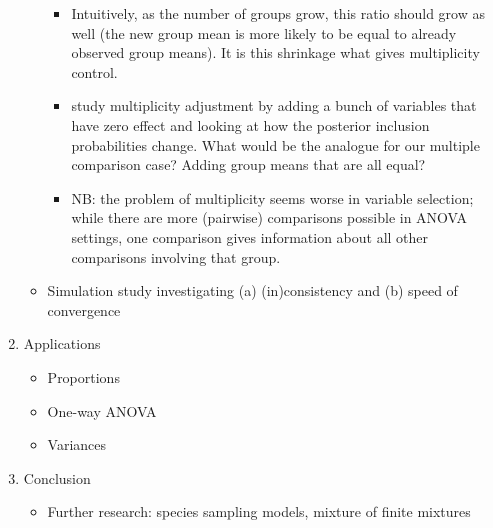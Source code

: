 \documentclass[11pt,a4paper]{article}
\theoremstyle{definition} %
\theoremstyle{case}
\begin{document}
\begin{enumerate}
\begin{itemize}
\begin{itemize}
            \item Intuitively, as the number of groups grow, this ratio should grow as well (the new group mean is more likely to be equal to already observed group means). It is this shrinkage what gives multiplicity control.
            \item \textcite{scott2010bayes} study multiplicity adjustment by adding a bunch of variables that have zero effect and looking at how the posterior inclusion probabilities change. What would be the analogue for our multiple comparison case? Adding group means that are all equal?
            \item NB: the problem of multiplicity seems worse in variable selection; while there are more (pairwise) comparisons possible in ANOVA settings, one comparison gives information about all other comparisons involving that group.
        \end{itemize}
        \item Simulation study investigating (a) (in)consistency and (b) speed of convergence
    \end{itemize}
    \item Applications
    \begin{itemize}
        \item Proportions
        \item One-way ANOVA
        \item Variances
    \end{itemize}
    \item Conclusion
    \begin{itemize}
        \item Further research: species sampling models, mixture of finite mixtures
    \end{itemize}
\end{enumerate}
\fi
\end{document}
